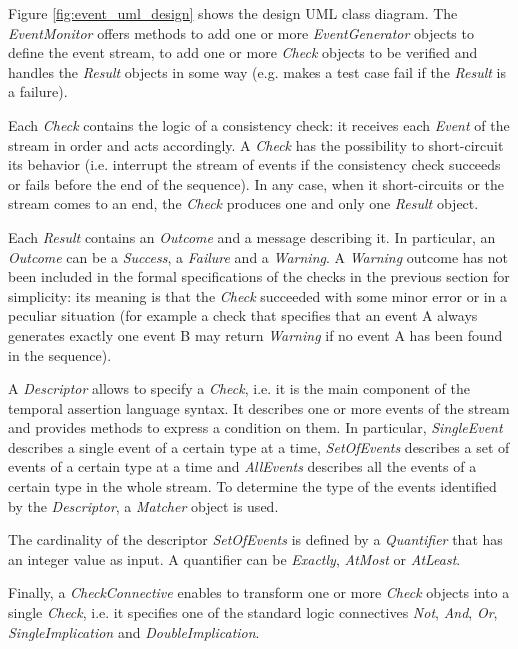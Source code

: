 \documentclass[11pt,a4paper,notitlepage]{article}
\begin{document}
Figure \ref{fig:event_uml_design} shows the design UML class diagram. The \textit{EventMonitor} offers methods to add one or more \textit{EventGenerator} objects to define the event stream, to add one or more \textit{Check} objects to be verified and handles the \textit{Result} objects in some way (e.g. makes a test case fail if the \textit{Result} is a failure).

Each \textit{Check} contains the logic of a consistency check: it receives each \textit{Event} of the stream in order and acts accordingly. A \textit{Check} has the possibility to short-circuit its behavior (i.e. interrupt the stream of events if the consistency check succeeds or fails before the end of the sequence). In any case, when it short-circuits or the stream comes to an end, the \textit{Check} produces one and only one \textit{Result} object.

Each \textit{Result} contains an \textit{Outcome} and a message describing it. In particular, an \textit{Outcome} can be a \textit{Success}, a \textit{Failure} and a \textit{Warning}. A \textit{Warning} outcome has not been included in the formal specifications of the checks in the previous section for simplicity: its meaning is that the \textit{Check} succeeded with some minor error or in a peculiar situation (for example a check that specifies that an event A always generates exactly one event B may return \textit{Warning} if no event A has been found in the sequence).

A \textit{Descriptor} allows to specify a \textit{Check}, i.e. it is the main component of the temporal assertion language syntax. It describes one or more events of the stream and provides methods to express a condition on them. In particular, \textit{SingleEvent} describes a single event of a certain type at a time, \textit{SetOfEvents} describes a set of events of a certain type at a time and \textit{AllEvents} describes all the events of a certain type in the whole stream. To determine the type of the events identified by the \textit{Descriptor}, a \textit{Matcher} object is used.

The cardinality of the descriptor \textit{SetOfEvents} is defined by a \textit{Quantifier} that has an integer value as input. A quantifier can be \textit{Exactly}, \textit{AtMost} or \textit{AtLeast}.

Finally, a \textit{CheckConnective} enables to transform one or more \textit{Check} objects into a single \textit{Check}, i.e. it specifies one of the standard logic connectives \textit{Not}, \textit{And}, \textit{Or}, \textit{SingleImplication} and \textit{DoubleImplication}.
\end{document}
